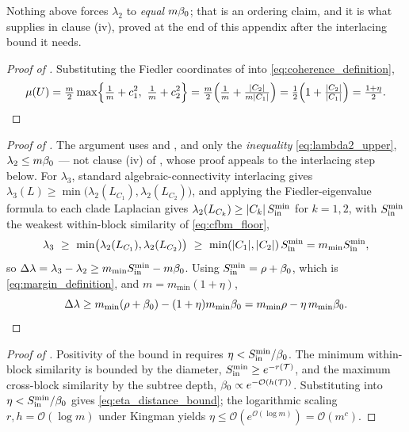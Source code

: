 \noindent Nothing above forces $\lambda_2$ to \emph{equal} $m\beta_0$; that is an
ordering claim, and it is what  supplies in clause (iv), proved at
the end of this appendix after the interlacing bound it needs.

\begin{proof}[Proof of ]
Substituting the Fiedler coordinates of  into
\eqref{eq:coherence_definition},
\[
   \coh=\tfrac m2\max\Bigl\{\tfrac1m+c_1^2,\ \tfrac1m+c_2^2\Bigr\}
       =\tfrac m2\Bigl(\tfrac1m+\tfrac{|C_2|}{m|C_1|}\Bigr)
       =\tfrac12\Bigl(1+\tfrac{|C_2|}{|C_1|}\Bigr)=\tfrac{1+\eta}{2}. \qedhere
\]
\end{proof}

\begin{proof}[Proof of ]
The argument uses  and , and only the
\emph{inequality} \eqref{eq:lambda2_upper}, $\lambda_2\le m\beta_0$ ---
not clause (iv) of , whose proof appeals to the interlacing step
below.
For $\lambda_3$, standard algebraic-connectivity interlacing gives
$\lambda_3(L)\ge\min\bigl(\lambda_2(L_{C_1}),\lambda_2(L_{C_2})\bigr)$, and applying
the Fiedler-eigenvalue formula to each clade Laplacian gives
$\lambda_2(L_{C_k})\ge|C_k|\,S_{\mathrm{in}}^{\min}$ for $k=1,2$, with $S_{\mathrm{in}}^{\min}$ the weakest
within-block similarity of \eqref{eq:cfbm_floor},
\begin{equation}\label{eq:lambda3_lower}
   \lambda_3\ \ge\ \min\bigl(\lambda_2(L_{C_1}),\lambda_2(L_{C_2})\bigr)
   \ \ge\ \min(|C_1|,|C_2|)\,S_{\mathrm{in}}^{\min}=m_{\min}S_{\mathrm{in}}^{\min},
\end{equation}
so $\Delta\lambda=\lambda_3-\lambda_2\ge m_{\min}S_{\mathrm{in}}^{\min}-m\beta_0$. Using
$S_{\mathrm{in}}^{\min}=\rho+\beta_0$, which is \eqref{eq:margin_definition}, and
$m=m_{\min}(1+\eta)$,
\[
   \Delta\lambda\ge m_{\min}(\rho+\beta_0)-(1+\eta)m_{\min}\beta_0
        =m_{\min}\rho-\eta\,m_{\min}\beta_0. \qedhere
\]
\end{proof}


\begin{proof}[Proof of ]
Positivity of the bound in  requires
$\eta<S_{\mathrm{in}}^{\min}/\beta_0$. The minimum within-block similarity is bounded by
the diameter, $S_{\mathrm{in}}^{\min}\ge e^{-r(\mathcal T)}$, and the maximum cross-block
similarity by the subtree depth, $\beta_0\propto e^{-\mathcal O(h(\mathcal T))}$.
Substituting into $\eta<S_{\mathrm{in}}^{\min}/\beta_0$ gives \eqref{eq:eta_distance_bound};
the logarithmic scaling $r,h=\mathcal O(\log m)$ under Kingman yields
$\eta\le\mathcal O(e^{\mathcal O(\log m)})=\mathcal O(m^c)$.
\end{proof}


